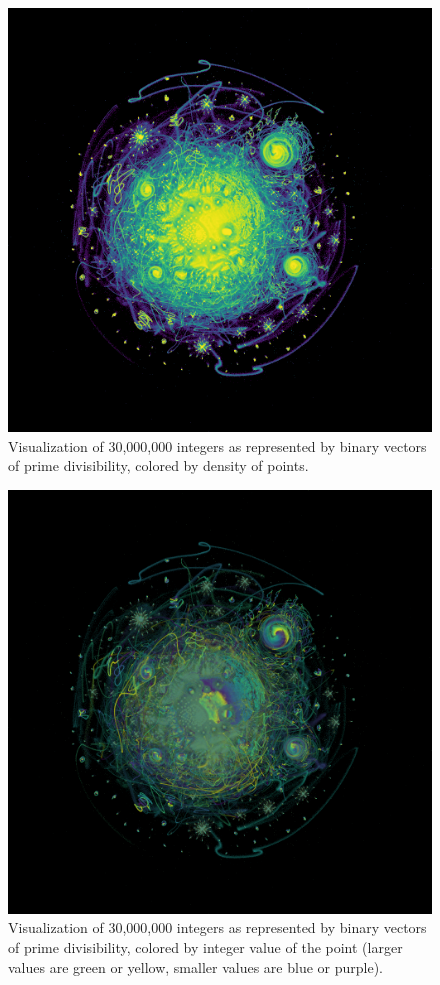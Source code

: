 \documentclass[12pt]{article}
\begin{document}
\begin{figure}
    \centering
    \includegraphics[width=\textwidth]{umap_3e7_by_density_viridis.png}
    \caption{Visualization of 30,000,000 integers as
    represented by binary vectors of prime divisibility, colored by density of points.}
    \label{fig:umap_3e7_density}
\end{figure}

\begin{figure}
    \centering
    \includegraphics[width=\textwidth]{umap_3e7_by_value_viridis.png}
    \caption{Visualization of 30,000,000 integers as
    represented by binary vectors of prime divisibility, colored by integer value of the point (larger values are green or yellow, smaller values are blue or purple).}
    \label{fig:umap_3e7_value}
\end{figure}
\end{document}
